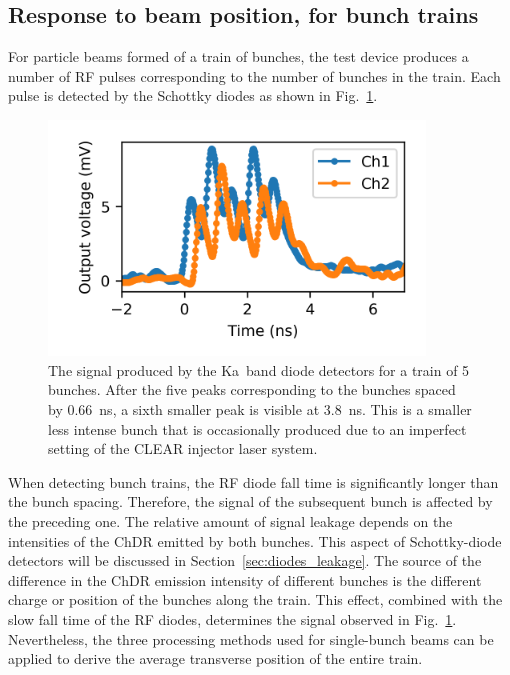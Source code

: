\subsection[Response to beam position, for bunch trains]{Response to beam position, for bunch trains}\label{sec:5_bunch}

For particle beams formed of a train of bunches, the test device produces a number of RF pulses corresponding to the number of bunches in the train. Each pulse is detected by the Schottky diodes as shown in Fig.~\ref{fig:diode_signal_5b}. 

\begin{figure}[h]
\centering
\includegraphics[width=10cm, keepaspectratio]{pictures/five_bunch_scope}
\caption{The signal produced by the Ka~band diode detectors for a train of 5 bunches. After the five peaks corresponding to the bunches spaced by 0.66~ns, a sixth smaller peak is visible at 3.8~ns. This is a smaller less intense bunch that is occasionally produced due to an imperfect setting of the CLEAR injector laser system.}
\label{fig:diode_signal_5b}
\end{figure}

When detecting bunch trains, the RF diode fall time is significantly longer than the bunch spacing. Therefore, the signal of the subsequent bunch is affected by the preceding one. The relative amount of signal leakage depends on the intensities of the ChDR emitted by both bunches. This aspect of Schottky-diode detectors will be discussed in Section~\ref{sec:diodes_leakage}. The source of the difference in the ChDR emission intensity of different bunches is the different charge or position of the bunches along the train. This effect, combined with the slow fall time of the RF diodes, determines the signal observed in Fig.~\ref{fig:diode_signal_5b}. Nevertheless, the three processing methods used for single-bunch beams can be applied to derive the average transverse position of the entire train. 

